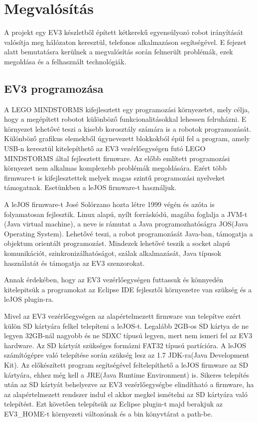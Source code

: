 \chapter{Megvalósítás}\label{ch:MEGVALOSITAS}
\begin{osszefoglal}
	A projekt egy EV3 készletből épített kétkerekű egyensúlyozó robot irányítását valósítja meg hálózaton keresztül, telefonos alkalmazáson segítségével. E fejezet alatt bemutatásra kerülnek a megvalósítás során felmerült problémák, ezek megoldása és a felhasznált technológiák.
\end{osszefoglal}
\section{EV3 programozása}\label{sec:MEGVALOSITAS:lejos}
A LEGO MINDSTORMS kifejlesztett egy programozási környezetet, mely célja, hogy a megépített robotot különböző funkcionalitásokkal lehessen felruházni. E környezet lehetővé teszi a kisebb korosztály számára is a robotok programozását. Különböző grafikus elemekből úgynevezett blokkokból épül fel a program, amely USB-n keresztül kitelepíthető az EV3 vezérlőegységen futó LEGO MINDSTORMS által fejlesztett firmware.
Az előbb említett programozási környezet nem alkalmas komplexebb problémák megoldására. Ezért több firmware-t is kifejlesztettek melyek magas szintű programozási nyelveket támogatnak. Esetünkben a leJOS firmware-t használjuk.

A leJOS firmware-t José Solórzano hozta létre 1999 végén és azóta is folyamatosan fejlesztik. Linux alapú, nyílt forráskódú, magába foglalja a JVM-t (Java virtual machine), a neve is rámutat a Java programozhatóságra JOS(Java Operating System). Lehetővé teszi, a robot programozását Java-ban, támogatja a objektum orientált programozást. Mindezek lehetővé teszik a socket alapú komunikációt, szinkronizálhatóságot, szálak alkalmazását, Java típusok használatát és támogatja az EV3 szenzorokat.

Annak érdekében, hogy az EV3 vezérlőegységen futtassuk és könnyedén kitelepitsük a programokat az Eclipse IDE fejlesztői környezetre van szükség és a leJOS plugin-ra.

Mivel az EV3 vezérlőegységen az alapértelmezett firmware van telepítve ezért külön SD kártyára felkel telepíteni a leJOS-t. Legalább 2GB-os SD kártya de ne legyen 32GB-nál nagyobb és ne SDXC típusú legyen, mert nem ismeri fel az EV3 hardware. Az SD kártyát szükséges formázni FAT32 típusú partícióra. A leJOS számítógépre való telepítése során szükség lesz az 1.7 JDK-ra(Java Development Kit). Az előkészített program segítségével feltelepíthető a leJOS firmware az SD kártyára, ehhez még kell a JRE(Java Runtime Environment) is. Sikeres telepítés után az SD kártyát behelyezve az EV3 vezérlőegységbe elindítható a firmware, ha az alapértelmezett rendszer indul el akkor megkel ismételni az SD kártyára való telepítést. Ezt követően telepítsük az Eclipse plugin-t majd berakjuk az EV3\_HOME-t környezeti változónak és a bin könyvtárat a path-be.

